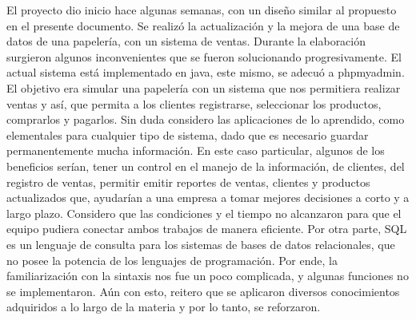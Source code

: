 \documentclass[30pt,fleqn]{article}
\begin{document}
El proyecto dio inicio hace algunas semanas, con un diseño similar al propuesto en el presente documento. 
Se realizó la actualización y la mejora de una base de datos de una papelería, con un sistema de ventas.
Durante la elaboración surgieron algunos inconvenientes que se fueron solucionando progresivamente.
El actual sistema está  implementado en java, este mismo, se adecuó a phpmyadmin.
El objetivo era simular una papelería con un sistema que nos permitiera realizar ventas y así,  que permita a los clientes registrarse, seleccionar los productos, comprarlos y pagarlos. 
Sin duda considero las aplicaciones de lo aprendido, como elementales para cualquier tipo de sistema, dado que es necesario guardar permanentemente mucha información.
En este caso particular, algunos de los beneficios serían, tener un control en el manejo de la información, de clientes, del registro de ventas, permitir emitir reportes de ventas, clientes y productos actualizados que, ayudarían a una empresa a tomar mejores decisiones a corto y a largo plazo.
Considero que las condiciones y el tiempo no alcanzaron para que el equipo pudiera conectar ambos trabajos de manera eficiente. 
Por otra parte, SQL es un lenguaje de consulta para los sistemas de bases de datos relacionales, que no posee la potencia de los lenguajes de programación. Por ende, la familiarización con la sintaxis nos fue un poco complicada, y algunas funciones no se implementaron.
Aún con esto, reitero que se aplicaron diversos conocimientos adquiridos a lo largo de la materia  y por lo tanto, se reforzaron.


\vfill
\end{document}
